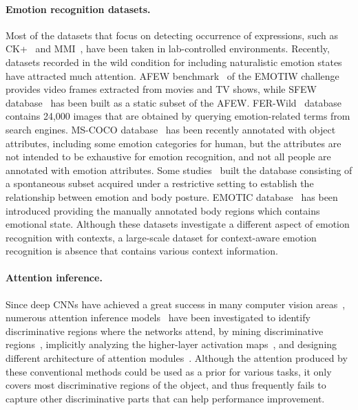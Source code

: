 \documentclass[10pt,twocolumn,letterpaper]{article}
\begin{document}
\vspace{-10pt}
\paragraph{Emotion recognition datasets.}\label{sec:22}
Most of the datasets that focus on detecting occurrence of expressions, such as CK+~\cite{lucey2010extended} and MMI~\cite{pantic2005web}, have been taken in lab-controlled environments. Recently, datasets recorded in the wild condition for including naturalistic emotion states~\cite{dhall2011acted,dhall2011static,mollahosseini2016facial} have attracted much attention. AFEW benchmark~\cite{dhall2011acted} of the EMOTIW challenge~\cite{dhall2016emotiw} provides video frames extracted from movies and TV shows, while SFEW database~\cite{dhall2011static} has been built as a static subset of the AFEW.
FER-Wild~\cite{mollahosseini2016facial} database contains 24,000 images that are obtained by querying emotion-related terms from search engines.
MS-COCO database~\cite{patterson2016coco} has been recently annotated with object attributes, including some emotion categories for human, but the attributes are not intended to be exhaustive for emotion recognition, and not all people are annotated with emotion attributes.
Some studies~\cite{kleinsmith2007recognizing, kleinsmith2011automatic} built the database consisting of a spontaneous subset acquired under a restrictive setting to establish the relationship between emotion and body posture.
EMOTIC database~\cite{kosti2017emotion} has been introduced providing the manually annotated body regions which contains emotional state.
Although these datasets investigate a different aspect of emotion recognition with contexts, a large-scale dataset for context-aware emotion recognition is absence that contains various context information.

\vspace{-10pt}
\paragraph{Attention inference.}\label{sec:23}
Since deep CNNs have achieved a great success in many computer vision areas~\cite{krizhevsky2012imagenet,simonyan2014very,he2016deep}, numerous attention inference models~\cite{zhou2016learning,selvaraju2017grad} have been investigated to identify discriminative regions where the networks attend, by mining discriminative regions~\cite{kumar2016track},
implicitly analyzing the higher-layer activation maps~\cite{zhou2016learning,selvaraju2017grad}, and designing different architecture of attention modules~\cite{woo2018cbam,hu2018squeeze}.
Although the attention produced by these conventional methods could be used as a prior for various tasks, it only covers most discriminative regions of the object, and thus frequently fails to capture other discriminative parts that can help performance improvement.
\end{document}
